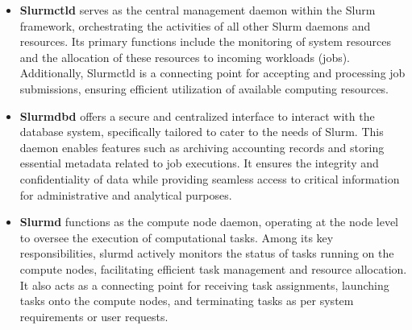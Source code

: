 \begin{itemize}
    \item \textbf{Slurmctld} serves as the central management daemon within the Slurm framework, orchestrating the activities of all other Slurm daemons and resources. Its primary functions include the monitoring of system resources and the allocation of these resources to incoming workloads (jobs). Additionally, Slurmctld is a connecting point for accepting and processing job submissions, ensuring efficient utilization of available computing resources.
    \item \textbf{Slurmdbd} offers a secure and centralized interface to interact with the database system, specifically tailored to cater to the needs of Slurm. This daemon enables features such as archiving accounting records and storing essential metadata related to job executions. It ensures the integrity and confidentiality of data while providing seamless access to critical information for administrative and analytical purposes.
    \item \textbf{Slurmd} functions as the compute node daemon, operating at the node level to oversee the execution of computational tasks. Among its key responsibilities, slurmd actively monitors the status of tasks running on the compute nodes, facilitating efficient task management and resource allocation. It also acts as a connecting point for receiving task assignments, launching tasks onto the compute nodes, and terminating tasks as per system requirements or user requests.
\end{itemize}





